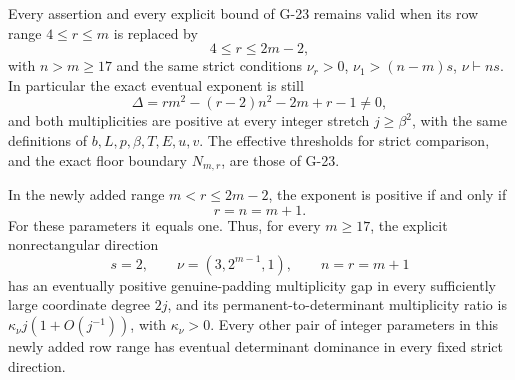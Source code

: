 \begin{theorem}\label{G-25}
Every assertion and every explicit bound of G-23 remains valid when its
row range $4\le r\le m$ is replaced by
\[
             4\le r\le2m-2,
\]
with $n>m\ge17$ and the same strict conditions
$\nu_r>0$, $\nu_1>(n-m)s$, $\nu\vdash ns$.
In particular the exact eventual exponent is still
\[
 \Delta=rm^2-(r-2)n^2-2m+r-1\ne0,
\]
and both multiplicities are positive at every integer stretch
$j\ge\beta^2$, with the same definitions of $b,L,p,\beta,T,E,u,v$.
The effective thresholds for strict comparison, and the exact
floor boundary $N_{m,r}$, are those of G-23.

In the newly added range $m<r\le2m-2$, the exponent is positive
if and only if
\[
                   r=n=m+1.
\]
For these parameters it equals one. Thus, for every $m\ge17$,
the explicit nonrectangular direction
\[
 s=2,\qquad \nu=(3,2^{m-1},1),\qquad n=r=m+1
\]
has an eventually positive genuine-padding multiplicity gap in
every sufficiently large coordinate degree $2j$, and its
permanent-to-determinant multiplicity ratio is
$\kappa_\nu j(1+O(j^{-1}))$, with $\kappa_\nu>0$.
Every other pair of integer parameters in this newly added row
range has eventual determinant dominance in every fixed strict
direction.
\end{theorem}

